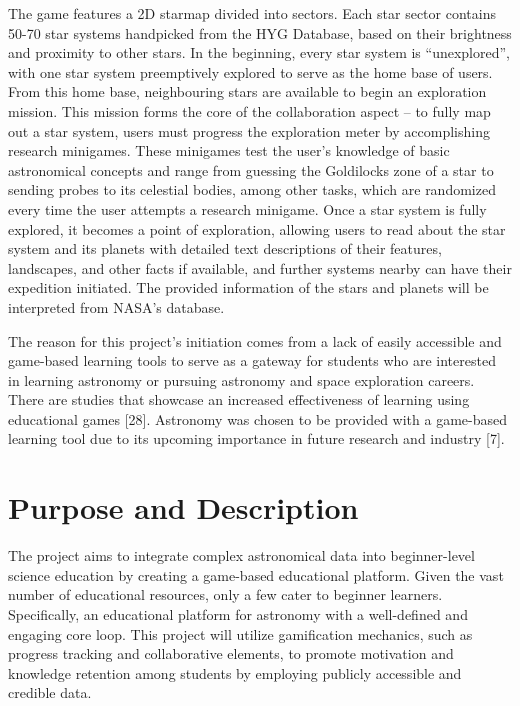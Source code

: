The game features a 2D starmap divided into sectors. Each star sector contains 50-70 star systems handpicked from the HYG Database, 
based on their brightness and proximity to other stars. In the beginning, every star system is “unexplored”, with one star system 
preemptively explored to serve as the home base of users. From this home base, neighbouring stars are available to begin an exploration 
mission. This mission forms the core of the collaboration aspect – to fully map out a star system, users must progress the exploration 
meter by accomplishing research minigames. These minigames test the user’s knowledge of basic astronomical concepts and range from 
guessing the Goldilocks zone of a star to sending probes to its celestial bodies, among other tasks, which are randomized every time 
the user attempts a research minigame. Once a star system is fully explored, it becomes a point of exploration, allowing users to read 
about the star system and its planets with detailed text descriptions of their features, landscapes, and other facts if available, and 
further systems nearby can have their expedition initiated. The provided information of the stars and planets will be interpreted from 
NASA’s database.

The reason for this project’s initiation comes from a lack of easily accessible and game-based learning tools to serve as a gateway for 
students who are interested in learning astronomy or pursuing astronomy and space exploration careers. There are studies that showcase 
an increased effectiveness of learning using educational games [28]. Astronomy was chosen to be provided with a game-based learning tool 
due to its upcoming importance in future research and industry [7].


\section{Purpose and Description}

The project aims to integrate complex astronomical data into beginner-level science education by creating a game-based educational 
platform. Given the vast number of educational resources, only a few cater to beginner learners. Specifically, an educational platform 
for astronomy with a well-defined and engaging core loop. This project will utilize gamification mechanics, such as progress tracking 
and collaborative elements, to promote motivation and knowledge retention among students by employing publicly accessible and credible 
data.

